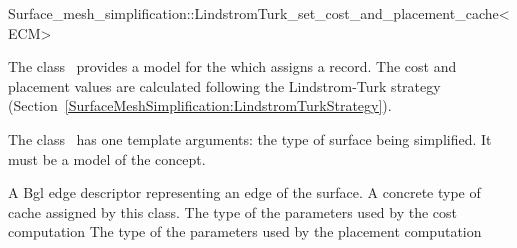 

\begin{ccRefClass}{Surface_mesh_simplification::LindstromTurk_set_cost_and_placement_cache<ECM>}


\ccDefinition

The class \ccRefName\ provides a model for the
 which assigns a  record.
The cost and placement values are calculated following the Lindstrom-Turk strategy
(Section~\ref{SurfaceMeshSimplification:LindstromTurkStrategy}).

The class \ccRefName\ has one template arguments: the type of surface being simplified. 
It must be a model of the  concept.

\ccIsModel
{}


\ccTypes
  \ccGlue
  {A {\sc Bgl} edge descriptor representing an edge of the surface.}
  \ccGlue
  {A concrete type of cache assigned by this class.}
  \ccGlue
  {The type of the parameters used by the cost computation}
  \ccGlue
  {The type of the parameters used by the placement computation}
            
\ccCreation
{}  %


\end{ccRefClass}
